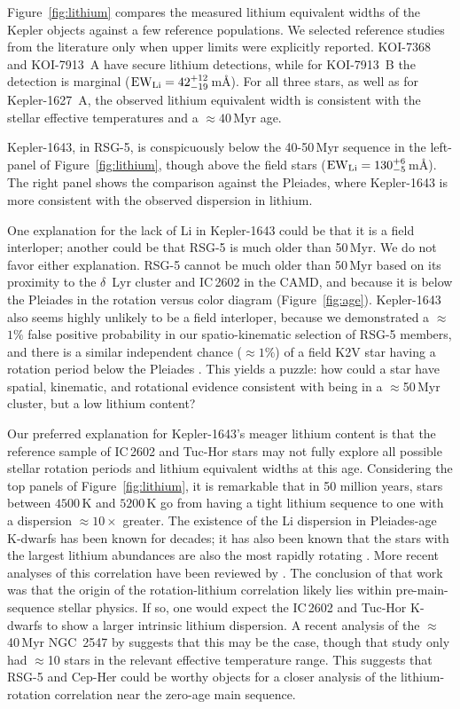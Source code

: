 \documentclass[12pt,twocolumn,tighten,linenumbers,trackchanges]{aastex63}
\begin{document}
Figure~\ref{fig:lithium} compares the measured lithium equivalent
widths of the Kepler objects against a few reference populations.  We
selected reference studies from the literature only when upper limits were
explicitly reported.  KOI-7368 and KOI-7913~A have secure lithium
detections, while for KOI-7913~B the detection is marginal (${\rm EW}_{\rm
Li} = 42^{+12}_{-19}$\,m\AA).  For all three stars, as well as for
Kepler-1627~A, the observed lithium equivalent width is consistent
with the stellar effective temperatures and a $\approx40$\,Myr age.

Kepler-1643, in RSG-5, is conspicuously below the 40-50$\,$Myr
sequence in the left-panel of Figure~\ref{fig:lithium}, though
above the field stars (${\rm EW}_{\rm Li} = 130^{+6}_{-5}$\,m\AA).
The right panel shows the comparison against the Pleiades, where
Kepler-1643 is more consistent with the observed dispersion in
lithium.

One explanation for the lack of Li in Kepler-1643 could be that it is a field
interloper; another could be that RSG-5 is much older than 50\,Myr.  We do
not favor either explanation.  
RSG-5 cannot be much older than 50\,Myr
based on its proximity to the $\delta$~Lyr cluster and IC\,2602 in the
CAMD, and because it is below the Pleiades in the 
rotation versus color diagram (Figure~\ref{fig:age}).
Kepler-1643 also seems highly unlikely to be a field interloper, 
because we demonstrated a $\approx$$1\%$ false positive probability
in our spatio-kinematic selection of RSG-5 members, and there is a 
similar independent chance
($\approx$$1\%$) of a field K2V star having a rotation period below the
Pleiades \citep{mcquillan_rotation_2014}.
This yields a puzzle: how could a star have spatial, kinematic, and rotational
evidence consistent with being in a $\approx$50\,Myr cluster,
but a low lithium content?

Our preferred explanation for Kepler-1643's meager lithium 
content is that the reference sample of IC\,2602 and Tuc-Hor
stars may not fully explore all possible stellar rotation
periods and lithium equivalent widths at this age. 
Considering the top panels of Figure~\ref{fig:lithium}, it is remarkable that in
50 million years, stars between $4500$\,K and $5200$\,K go from
having a tight lithium sequence to one with a dispersion
$\approx10\times$ greater.  The existence of the Li dispersion in
Pleiades-age K-dwarfs has been known for decades; it has also been
known that the stars with the largest lithium abundances are also the
most rapidly rotating
\citep{butler_pleiades_1987,soderblom_evolution_1993}.  More recent
analyses of this correlation have been reviewed by
\citet{bouvier_lithium-rotation_2020}.  The conclusion of that work
was that the origin of the rotation-lithium correlation likely lies
within pre-main-sequence stellar physics.  If so, one would expect the
IC\,2602 and Tuc-Hor K-dwarfs to show a larger intrinsic lithium
dispersion.  A recent analysis of the $\approx$40\,Myr
NGC~2547 by \citet{binks_2022} suggests that this may
be the case, though that study only had $\approx$10 stars in the relevant
effective temperature range.
This suggests that
RSG-5 and Cep-Her could be
worthy objects for a closer analysis of the lithium-rotation correlation
near the zero-age main sequence.
\end{document}
